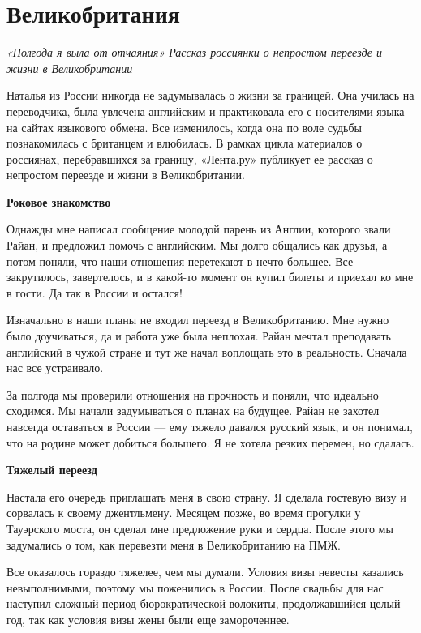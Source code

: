 \newpage
\section{Великобритания}

\textit{«Полгода я выла от отчаяния» Рассказ россиянки о непростом переезде и жизни в Великобритании }

Наталья из России никогда не задумывалась о жизни за границей. Она училась на переводчика, была увлечена английским и практиковала его с носителями языка на сайтах языкового обмена. Все изменилось, когда она по воле судьбы познакомилась с британцем и влюбилась. В рамках цикла материалов о россиянах, перебравшихся за границу, «Лента.ру» публикует ее рассказ о непростом переезде и жизни в Великобритании.

\textbf{Роковое знакомство}

Однажды мне написал сообщение молодой парень из Англии, которого звали Райан, и предложил помочь с английским. Мы долго общались как друзья, а потом поняли, что наши отношения перетекают в нечто большее. Все закрутилось, завертелось, и в какой-то момент он купил билеты и приехал ко мне в гости. Да так в России и остался!

Изначально в наши планы не входил переезд в Великобританию. Мне нужно было доучиваться, да и работа уже была неплохая. Райан мечтал преподавать английский в чужой стране и тут же начал воплощать это в реальность. Сначала нас все устраивало.

За полгода мы проверили отношения на прочность и поняли, что идеально сходимся. Мы начали задумываться о планах на будущее. Райан не захотел навсегда оставаться в России — ему тяжело давался русский язык, и он понимал, что на родине может добиться большего. Я не хотела резких перемен, но сдалась.

\textbf{Тяжелый переезд}

Настала его очередь приглашать меня в свою страну. Я сделала гостевую визу и сорвалась к своему джентльмену. Месяцем позже, во время прогулки у Тауэрского моста, он сделал мне предложение руки и сердца. После этого мы задумались о том, как перевезти меня в Великобританию на ПМЖ.

Все оказалось гораздо тяжелее, чем мы думали. Условия визы невесты казались невыполнимыми, поэтому мы поженились в России. После свадьбы для нас наступил сложный период бюрократической волокиты, продолжавшийся целый год, так как условия визы жены были еще замороченнее.

